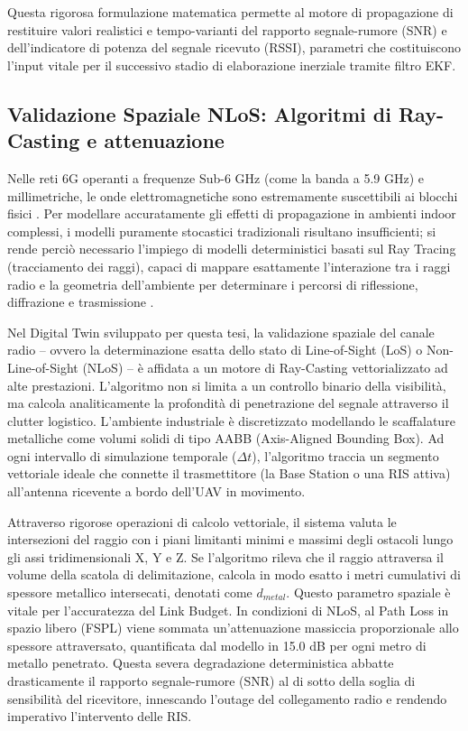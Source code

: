 \documentclass[twoside]{article}
\begin{document}
Questa rigorosa formulazione matematica permette al motore di propagazione di restituire valori realistici e tempo-varianti del rapporto segnale-rumore (SNR) e dell'indicatore di potenza del segnale ricevuto (RSSI), parametri che costituiscono l'input vitale per il successivo stadio di elaborazione inerziale tramite filtro EKF.
\subsection{Validazione Spaziale NLoS: Algoritmi di Ray-Casting e attenuazione}

Nelle reti 6G operanti a frequenze Sub-6 GHz (come la banda a 5.9 GHz) e millimetriche, le onde elettromagnetiche sono estremamente suscettibili ai blocchi fisici \cite{Huang2022}. Per modellare accuratamente gli effetti di propagazione in ambienti indoor complessi, i modelli puramente stocastici tradizionali risultano insufficienti; si rende perciò necessario l'impiego di modelli deterministici basati sul Ray Tracing (tracciamento dei raggi), capaci di mappare esattamente l'interazione tra i raggi radio e la geometria dell'ambiente per determinare i percorsi di riflessione, diffrazione e trasmissione \cite{Huang2022}.

Nel Digital Twin sviluppato per questa tesi, la validazione spaziale del canale radio -- ovvero la determinazione esatta dello stato di Line-of-Sight (LoS) o Non-Line-of-Sight (NLoS) -- è affidata a un motore di Ray-Casting vettorializzato ad alte prestazioni. L'algoritmo non si limita a un controllo binario della visibilità, ma calcola analiticamente la profondità di penetrazione del segnale attraverso il clutter logistico. L'ambiente industriale è discretizzato modellando le scaffalature metalliche come volumi solidi di tipo AABB (Axis-Aligned Bounding Box). Ad ogni intervallo di simulazione temporale ($\Delta t$), l'algoritmo traccia un segmento vettoriale ideale che connette il trasmettitore (la Base Station o una RIS attiva) all'antenna ricevente a bordo dell'UAV in movimento.

Attraverso rigorose operazioni di calcolo vettoriale, il sistema valuta le intersezioni del raggio con i piani limitanti minimi e massimi degli ostacoli lungo gli assi tridimensionali X, Y e Z. Se l'algoritmo rileva che il raggio attraversa il volume della scatola di delimitazione, calcola in modo esatto i metri cumulativi di spessore metallico intersecati, denotati come $d_{metal}$. Questo parametro spaziale è vitale per l'accuratezza del Link Budget. In condizioni di NLoS, al Path Loss in spazio libero (FSPL) viene sommata un'attenuazione massiccia proporzionale allo spessore attraversato, quantificata dal modello in 15.0 dB per ogni metro di metallo penetrato. Questa severa degradazione deterministica abbatte drasticamente il rapporto segnale-rumore (SNR) al di sotto della soglia di sensibilità del ricevitore, innescando l'outage del collegamento radio e rendendo imperativo l'intervento delle RIS.
\end{document}
